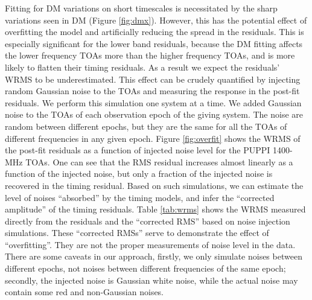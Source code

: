 Fitting for DM variations on short timescales is necessitated by the sharp
variations seen in DM (Figure \ref{fig:dmx}). However, this has the potential
effect of overfitting the model and artificially reducing the spread in the
residuals.
This is especially significant for the lower band residuals, because
the DM fitting affects the lower frequency TOAs more than the
higher frequency TOAs, and is more likely to flatten their timing residuals. 
As a result we expect the residuals' WRMS to be 
underestimated. This effect can be crudely quantified
by injecting random Gaussian noise to the TOAs and
measuring the response in the post-fit residuals. 
We perform this simulation one system at a time. 
We added Gaussian noise to the TOAs of each observation epoch of the giving system.
The noise are random between different epochs, but they are the
same for all the TOAs of different frequencies in any given epoch. 
Figure \ref{fig:overfit} shows
the WRMS of the post-fit residuals as a function of injected
noise level for the PUPPI 1400-MHz TOAs. 
One can see that the RMS residual increases almost linearly as a function of the
injected noise, but only a fraction of the injected noise is recovered in the timing 
residual. Based on such simulations, we
can estimate the level of noises ``absorbed'' by the timing models, and infer 
the ``corrected amplitude'' of the timing residuals. 
Table \ref{tab:wrms} shows the WRMS measured directly from the residuals 
and the ``corrected RMS'' based on noise injection simulations. 
These ``corrected RMSs'' serve to demonstrate the effect of ``overfitting''.
They are not the proper measurements of noise level in the data. There are some 
caveats in our approach, firstly, we only simulate noises between different
epochs, not noises between different frequencies of the same epoch; secondly, 
the injected noise is Gaussian white noise, while the actual 
noise may contain some red and non-Gaussian noises. 

